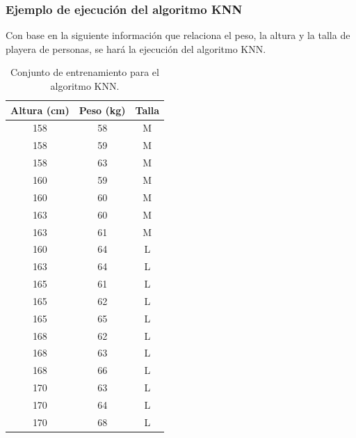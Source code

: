 \subsubsection{Ejemplo de ejecución del algoritmo KNN}
Con base en la siguiente información que relaciona el peso, la altura y la talla de playera de personas, se hará la ejecución del algoritmo KNN.\\

	\begin{table}[H]
		\begin{center}
			\label{tab:tablaKNN}
			\begin{tabular}{c|c|c}
				\textbf{Altura (cm)} & \textbf{Peso (kg)} & \textbf{Talla}\\
				\hline
				158 & 58 & M\\
				158 & 59 & M\\
				158 & 63 & M\\
				160 & 59 & M\\
				160 & 60 & M\\
				163 & 60 & M\\
				163 & 61 & M\\
				160 & 64 & L\\
				163 & 64 & L\\
				165 & 61 & L\\
				165 & 62 & L\\
				165 & 65 & L\\
				168 & 62 & L\\
				168 & 63 & L\\
				168 & 66 & L\\
				170 & 63 & L\\
				170 & 64 & L\\
				170 & 68 & L\\
			\end{tabular}
		\end{center}
		\caption{Conjunto de entrenamiento para el algoritmo KNN.}
	\end{table}

